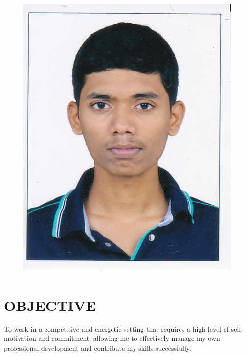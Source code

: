\documentclass[margin]{res}
\begin{document}

\address{302 Matoshree Pearl\\Shree Rameshwar CHS\\Opp. Dreams Mall, LBS Marg\\Bhandup(W)\\Mumbai-400078} 

\address{Contact No. +91 9867906725\\
Email id: shedekarhrishi@gmail.com} 


\begin{resume}


\begin{figure}[ht]
    \includegraphics[width=.3\textwidth,right]{me}
\end{figure}

\section{OBJECTIVE}  

To work in a competitive and energetic setting that requires a high level of self-motivation and commitment, allowing me to effectively manage my own professional development and contribute my skills successfully.

\end{resume}
\end{document}

